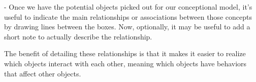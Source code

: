 - Once we have the potential objects picked out for our conceptional model, it's useful to indicate the main relationships or associations between those concepts by drawing lines between the boxes. 
  Now, optionally, it may be useful to add a short note to actually describe the relationship. 

  The benefit of detailing these relationships is that it makes it easier to realize which objects interact with each other, 
  meaning which objects have behaviors that affect other objects.